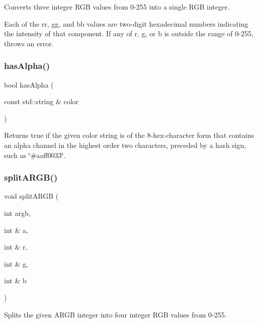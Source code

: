 Converts three integer R\+GB values from 0-\/255 into a single R\+GB integer. 

Each of the {\ttfamily rr}, {\ttfamily gg}, and {\ttfamily bb} values are two-\/digit hexadecimal numbers indicating the intensity of that component. If any of r, g, or b is outside the range of 0-\/255, throws an error. \mbox{\label{classGColor_ac3793cbac78369b75b4d8967d8cb2b7a}} 
\subsubsection{\texorpdfstring{has\+Alpha()}{hasAlpha()}}
{\footnotesize\ttfamily bool has\+Alpha (\begin{DoxyParamCaption}\item[{const std\+::string \&}]{color }\end{DoxyParamCaption})\hspace{0.3cm}{\ttfamily [static]}}



Returns true if the given color string is of the 8-\/hex-\/character form that contains an alpha channel in the highest order two characters, preceded by a hash sign, such as \char`\"{}\#aaff0033\char`\"{}. 

\mbox{\label{classGColor_aa0ad89394f00240bdc0ec3b893eca6aa}} 
\subsubsection{\texorpdfstring{split\+A\+R\+G\+B()}{splitARGB()}}
{\footnotesize\ttfamily void split\+A\+R\+GB (\begin{DoxyParamCaption}\item[{int}]{argb,  }\item[{int \&}]{a,  }\item[{int \&}]{r,  }\item[{int \&}]{g,  }\item[{int \&}]{b }\end{DoxyParamCaption})\hspace{0.3cm}{\ttfamily [static]}}



Splits the given A\+R\+GB integer into four integer R\+GB values from 0-\/255. 

